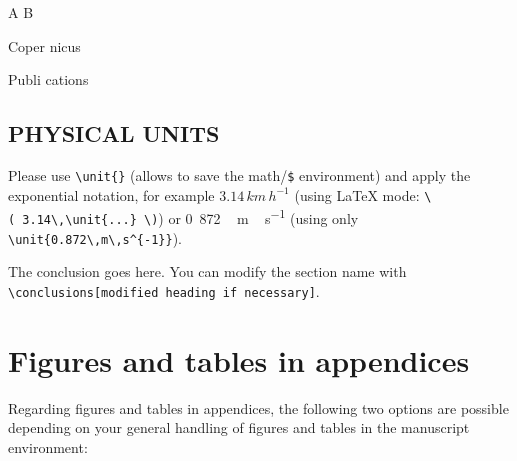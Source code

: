 \documentclass[gmd, manuscript]{copernicus}
\begin{document}
\begin{reaction}
A \rightarrow B \\
\end{reaction}
\begin{reaction}
Coper \rightleftharpoons nicus \\
\end{reaction}
\begin{reaction}
Publi \leftrightarrow cations
\end{reaction}

\subsection{PHYSICAL UNITS}

Please use \texttt{\textbackslash{}unit\{\}} (allows to save the
math/\texttt{\$} environment) and apply the exponential notation, for
example \(3.14\,\unit{km\,h^{-1}}\) (using LaTeX mode:
\texttt{\textbackslash{}(\ 3.14\textbackslash{},\textbackslash{}unit\{...\}\ \textbackslash{})})
or \unit{0.872\,m\,s^{-1}} (using only
\texttt{\textbackslash{}unit\{0.872\textbackslash{},m\textbackslash{},s\^{}\{-1\}\}}).

\conclusions[Conclusions]

The conclusion goes here. You can modify the section name with
\texttt{\textbackslash{}conclusions{[}modified\ heading\ if\ necessary{]}}.







\appendix
\section{Figures and tables in appendices}

Regarding figures and tables in appendices, the following two options
are possible depending on your general handling of figures and tables in
the manuscript environment:
\end{document}
